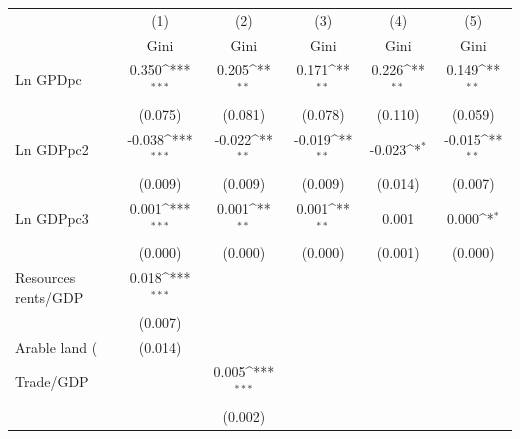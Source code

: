 {
\def\sym#1{\ifmmode^{#1}\else\(^{#1}\)\fi}
\begin{tabular}{l*{5}{c}}
\hline\hline
                    &\multicolumn{1}{c}{(1)}&\multicolumn{1}{c}{(2)}&\multicolumn{1}{c}{(3)}&\multicolumn{1}{c}{(4)}&\multicolumn{1}{c}{(5)}\\
                    &\multicolumn{1}{c}{Gini}&\multicolumn{1}{c}{Gini}&\multicolumn{1}{c}{Gini}&\multicolumn{1}{c}{Gini}&\multicolumn{1}{c}{Gini}\\
\hline
Ln GPDpc            &       0.350\sym{***}&       0.205\sym{**} &       0.171\sym{**} &       0.226\sym{**} &       0.149\sym{**} \\
                    &     (0.075)         &     (0.081)         &     (0.078)         &     (0.110)         &     (0.059)         \\
[1em]
Ln GDPpc2           &      -0.038\sym{***}&      -0.022\sym{**} &      -0.019\sym{**} &      -0.023\sym{*}  &      -0.015\sym{**} \\
                    &     (0.009)         &     (0.009)         &     (0.009)         &     (0.014)         &     (0.007)         \\
[1em]
Ln GDPpc3           &       0.001\sym{***}&       0.001\sym{**} &       0.001\sym{**} &       0.001         &       0.000\sym{*}  \\
                    &     (0.000)         &     (0.000)         &     (0.000)         &     (0.001)         &     (0.000)         \\
[1em]
Resources rents/GDP &       0.018\sym{***}&                     &                     &                     &                     \\
                    &     (0.007)         &                     &                     &                     &                     \\
[1em]
Arable land (%
                    &     (0.014)         &                     &                     &                     &                     \\
[1em]
Trade/GDP           &                     &       0.005\sym{***}&                     &                     &                     \\
                    &                     &     (0.002)         &                     &                     &                     \\

\end{tabular}}
